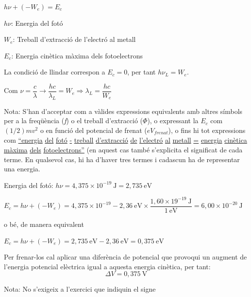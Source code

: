 \begin{solapartat}
 $h\nu + (-W_e) = E_c$

 $h\nu$: Energia del fotó

 $W_e$: Treball d'extracció de l'electró al metall

 $E_c$: Energia cinètica màxima dels fotoelectrons

\medskip
{} La condició de llindar correspon a $E_c = 0$, per tant $h\nu_L = W_e$.

Com $\nu = \dfrac{c}{\lambda} \rightarrow \dfrac{hc}{\lambda_L} = W_e \Rightarrow \lambda_L = \dfrac{hc}{W_e}$

Nota: S'han d'acceptar com a vàlides expressions equivalents amb altres símbols per a la freqüència (\textit{f}) o el treball d'extracció (\textit{$\Phi$}), o expressant la $E_c$ com $(1/2)mv^2$ o en funció del potencial de frenat ($eV_\textit{frenat}$), o fins hi tot expressions com \underline{``energia} \underline{del} \underline{fotó} \underline{-} \underline{treball} \underline{d'extracció} \underline{de} \underline{l'electró} \underline{al} \underline{metall} \underline{=} \underline{energia} \underline{cinètica} \underline{màxima} \underline{dels} \underline{fotoelectrons''} (en aquest cas també s'explicita el significat de cada terme. En qualsevol cas, hi ha d'haver tres termes i cadascun ha de representar una energia.
\end{solapartat}

\begin{solapartat}
 Energia del fotó: $h\nu = 4,375\times 10^{-19}\ \mathrm{J} = 2,735\ \mathrm{eV}$

 $E_c = h\nu + (-W_e) = 4,375\times 10^{-19} - 2,36\ \mathrm{eV}\times\dfrac{1,60\times 19^{-19}\ \mathrm{J}}{1\ \mathrm{eV}} = 6,00\times 10^{-20}\ \mathrm{J}$

o bé, de manera equivalent

$E_c = h\nu + (-W_e) = 2,735\ \mathrm{eV} - 2,36\ \mathrm{eV} = 0,375\ \mathrm{eV}$

\medskip
{} Per frenar-los cal aplicar una diferència de potencial que provoqui un augment de l'energia potencial elèctrica igual a aquesta energia cinètica, per tant:
\[ \mathit{\Delta} V = 0,375\ \mathrm{V} \]

Nota: No s'exigeix a l'exercici que indiquin el signe
\end{solapartat}
